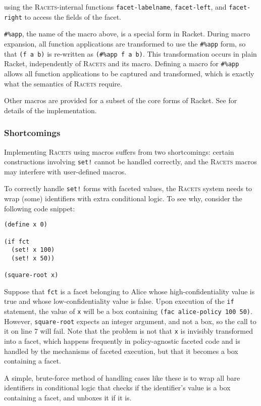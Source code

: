 \documentclass{article}
\begin{document}
\noindent using the \textsc{Racets}-internal functions \texttt{facet-labelname}, \texttt{facet-left}, and \texttt{facet-right} to access the fields of the facet.

\texttt{\#\%app}, the name of the macro above, is a special form in Racket. During macro expansion, all function applications are transformed to use the \texttt{\#\%app} form, so that \texttt{(f a b)} is re-written as \texttt{(\#\%app f a b)}. This transformation occurs in plain Racket, independently of \textsc{Racets} and its macro. Defining a macro for \texttt{\#\%app} allows all function applications to be captured and transformed, which is exactly what the semantics of \textsc{Racets} require.

Other macros are provided for a subset of the core forms of Racket. See \cite{racets} for details of the implementation.


\subsubsection{Shortcomings\label{sec:shortcomings}}
Implementing \textsc{Racets} using macros suffers from two shortcomings: certain constructions involving \texttt{set!} cannot be handled correctly, and the \textsc{Racets} macros may interfere with user-defined macros.

To correctly handle \texttt{set!} forms with faceted values, the \textsc{Racets} system needs to wrap (some) identifiers with extra conditional logic. To see why, consider the following code snippet:

\begin{lstlisting}
(define x 0)

(if fct
  (set! x 100)
  (set! x 50))

(square-root x)
\end{lstlisting}

Suppose that \texttt{fct} is a facet belonging to Alice whose high-confidentiality value is true and whose low-confidentiality value is false. Upon execution of the \texttt{if} statement, the value of \texttt{x} will be a box containing \texttt{(fac alice-policy 100 50)}. However, \texttt{square-root} expects an integer argument, and not a box, so the call to it on line 7 will fail. Note that the problem is not that \texttt{x} is invisibly transformed into a facet, which happens frequently in policy-agnostic faceted code and is handled by the mechanisms of faceted execution, but that it becomes a box containing a facet.

A simple, brute-force method of handling cases like these is to wrap all bare identifiers in conditional logic that checks if the identifier's value is a box containing a facet, and unboxes it if it is.
\end{document}
